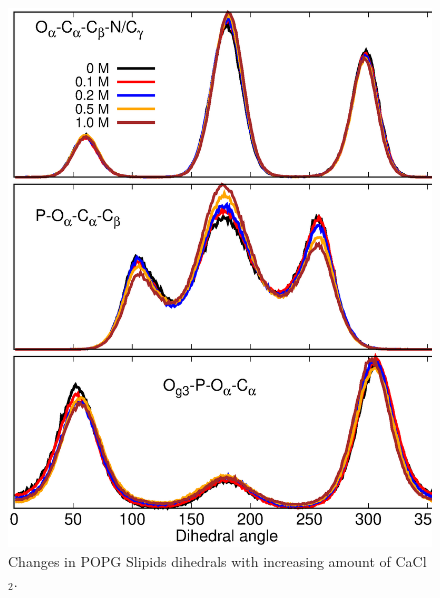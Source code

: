 \documentclass[journal=jpcbfk]{achemso}
\begin{document}
\begin{figure}[]
  \centering
  \includegraphics[width=16.0cm]{./Figs/DIHEDRALSslipidsWITHCaClPOPG.eps}
  \caption{\label{DIHSwithCAslipidsPOPG}
    Changes in POPG Slipids dihedrals with increasing amount of CaCl$_2$.
  }
\end{figure}
\end{document}
